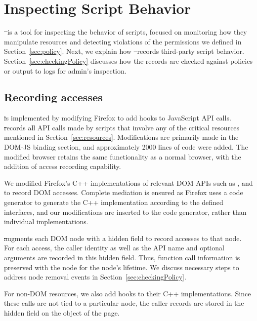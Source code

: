 \section{Inspecting Script Behavior}
\label{sec:st}

\st\ is a tool for inspecting the behavior of scripts, focused on
monitoring how they manipulate resources and detecting violations of the
permissions we defined in Section~\ref{sec:policy}.  Next, we explain
how \st\ records third-party script
behavior. Section~\ref{sec:checkingPolicy} discusses how the records are
checked against policies or output to logs for admin's inspection.

\subsection{Recording accesses}
\label{sec:recording}

\st is implemented by modifying Firefox to add hooks to JavaScript API calls.  \st records all API calls made by scripts that involve any of the critical resources mentioned in Section~\ref{sec:resources}.  Modifications are primarily made in the DOM-JS binding section, and approximately 2000 lines of code were added.  The modified browser retains the same functionality as a normal browser, with the addition of access recording capability.

 We modified Firefox's C++ implementations of relevant DOM APIs such as
,  and  to record DOM accesses.
Complete mediation is ensured as Firefox uses a code generator to
generate the C++ implementation according to the defined interfaces, and
our modifications are inserted to the code generator, rather than
individual implementations.

\st augments each DOM node with a hidden field to record accesses to
that node.  For each access, the caller identity as well as the API name
and optional arguments are recorded in this hidden field.  Thus,
function call information is preserved with the node for the node's
lifetime.  We discuss necessary steps to address node removal events in
Section~\ref{sec:checkingPolicy}.

  For non-DOM resources, we also add hooks to their C++ implementations. Since these calls are not tied to a particular node, the caller records are stored in the hidden field on the  object of the page. 

